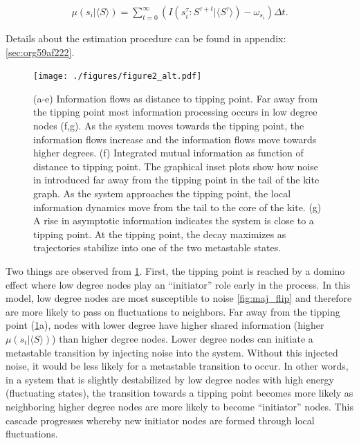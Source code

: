\documentclass[a4paper, 11pt, twocolumn]{article}
\begin{document}
\begin{equation}
\label{eq:adj_imi_conditional}
\begin{split}
\mu(s_i  | \langle  S \rangle) =  \sum_{t = 0}^\infty (I(s_i^{\tau} : S^{\tau + t} | \langle S^{\tau} \rangle) - \omega_{s_i}) \Delta t.
\end{split}
\end{equation}

Details  about  the estimation  procedure  can  be found  in
appendix: \ref{sec:org59af222}.

\begin{figure}[th]
\centering
\texttt{[image: ./figures/figure2\_alt.pdf]}
\caption{\label{fig:kite_res}(a-e) Information flows as distance to tipping point. Far away from the tipping point most information processing occurs in low degree nodes (f,g). As the system moves towards the tipping point, the information flows increase and the information flows move towards higher degrees. (f) Integrated mutual information as function of distance to tipping point. The graphical inset plots show how noise in introduced far away from the tipping point in the tail of the kite graph. As the system approaches the tipping point, the local information dynamics move from the tail to the core of the kite. (g) A rise in asymptotic information indicates the system is close to a tipping point. At the tipping point, the decay maximizes as trajectories stabilize into one of the two metastable states.}
\end{figure}

Two things are observed from \cref{fig:kite_res}. First, the
tipping point is reached by a domino effect where low degree
nodes play an ``initiator'' role early in the process. In this
model,  low  degree  nodes  are most  susceptible  to  noise
\cref{fig:maj_flip} and therefore are more likely to pass on
fluctuations to  neighbors. Far away from  the tipping point
(\cref{fig:kite_res}{a}),  nodes  with   lower  degree  have
higher shared information  (higher \(\mu(s_i | \langle  S \rangle)\)) than
higher  degree  nodes. Lower  degree  nodes  can initiate  a
metastable transition  by injecting  noise into  the system.
Without this injected  noise, it would be less  likely for a
metastable transition to occur. In  other words, in a system
that is slightly destabilized by  low degree nodes with high
energy  (fluctuating  states),   the  transition  towards  a
tipping  point becomes  more  likely  as neighboring  higher
degree nodes  are more  likely to become  ``initiator'' nodes.
This  cascade progresses  whereby  new  initiator nodes  are
formed through local fluctuations.
\end{document}
